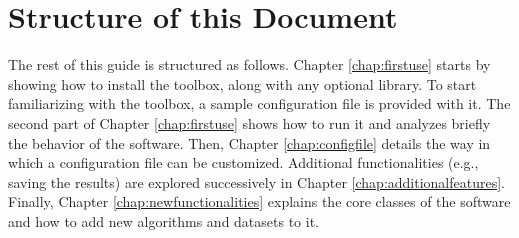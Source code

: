 \section*{Structure of this Document}

The rest of this guide is structured as follows. Chapter \ref{chap:firstuse} starts by showing how to install the toolbox, along with any optional library. To start familiarizing with the toolbox, a sample configuration file is provided with it. The second part of Chapter \ref{chap:firstuse} shows how to run it and analyzes briefly the behavior of the software. Then, Chapter \ref{chap:configfile} details the way in which a configuration file can be customized. Additional functionalities (e.g., saving the results) are explored successively in Chapter \ref{chap:additionalfeatures}. Finally, Chapter \ref{chap:newfunctionalities} explains the core classes of the software and how to add new algorithms and datasets to it.